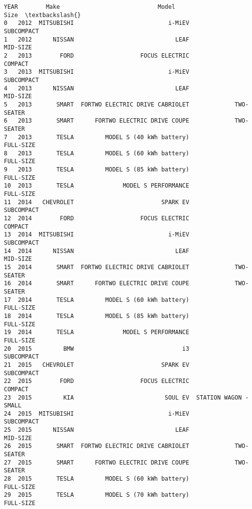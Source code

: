 \documentclass[11pt]{article}
\begin{document}
    \begin{Verbatim}[commandchars=\\\{\}]
    YEAR        Make                            Model                   Size  \textbackslash{}
0   2012  MITSUBISHI                           i-MiEV             SUBCOMPACT   
1   2012      NISSAN                             LEAF               MID-SIZE   
2   2013        FORD                   FOCUS ELECTRIC                COMPACT   
3   2013  MITSUBISHI                           i-MiEV             SUBCOMPACT   
4   2013      NISSAN                             LEAF               MID-SIZE   
5   2013       SMART  FORTWO ELECTRIC DRIVE CABRIOLET             TWO-SEATER   
6   2013       SMART      FORTWO ELECTRIC DRIVE COUPE             TWO-SEATER   
7   2013       TESLA         MODEL S (40 kWh battery)              FULL-SIZE   
8   2013       TESLA         MODEL S (60 kWh battery)              FULL-SIZE   
9   2013       TESLA         MODEL S (85 kWh battery)              FULL-SIZE   
10  2013       TESLA              MODEL S PERFORMANCE              FULL-SIZE   
11  2014   CHEVROLET                         SPARK EV             SUBCOMPACT   
12  2014        FORD                   FOCUS ELECTRIC                COMPACT   
13  2014  MITSUBISHI                           i-MiEV             SUBCOMPACT   
14  2014      NISSAN                             LEAF               MID-SIZE   
15  2014       SMART  FORTWO ELECTRIC DRIVE CABRIOLET             TWO-SEATER   
16  2014       SMART      FORTWO ELECTRIC DRIVE COUPE             TWO-SEATER   
17  2014       TESLA         MODEL S (60 kWh battery)              FULL-SIZE   
18  2014       TESLA         MODEL S (85 kWh battery)              FULL-SIZE   
19  2014       TESLA              MODEL S PERFORMANCE              FULL-SIZE   
20  2015         BMW                               i3             SUBCOMPACT   
21  2015   CHEVROLET                         SPARK EV             SUBCOMPACT   
22  2015        FORD                   FOCUS ELECTRIC                COMPACT   
23  2015         KIA                          SOUL EV  STATION WAGON - SMALL   
24  2015  MITSUBISHI                           i-MiEV             SUBCOMPACT   
25  2015      NISSAN                             LEAF               MID-SIZE   
26  2015       SMART  FORTWO ELECTRIC DRIVE CABRIOLET             TWO-SEATER   
27  2015       SMART      FORTWO ELECTRIC DRIVE COUPE             TWO-SEATER   
28  2015       TESLA         MODEL S (60 kWh battery)              FULL-SIZE   
29  2015       TESLA         MODEL S (70 kWh battery)              FULL-SIZE   

\end{Verbatim}
\end{document}
